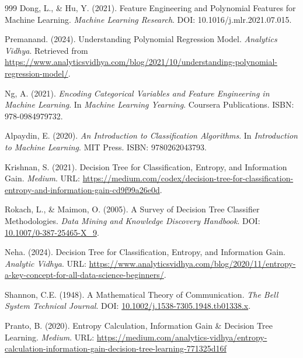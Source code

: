 \documentclass[12pt, a4paper,oneside]{book}
\numberwithin{equation}{section}
\begin{document}
\begin{thebibliography}{999}
Dong, L., \& Hu, Y. (2021). Feature Engineering and Polynomial Features for Machine Learning. \textit{Machine Learning Research}. DOI: 10.1016/j.mlr.2021.07.015.

Premanand. (2024). Understanding Polynomial Regression Model. \textit{Analytics Vidhya}. Retrieved from \url{https://www.analyticsvidhya.com/blog/2021/10/understanding-polynomial-regression-model/}{}.

Ng, A. (2021). \textit{Encoding Categorical Variables and Feature Engineering in Machine Learning}. In \textit{Machine Learning Yearning}. Coursera Publications. ISBN: 978-0984979732.

Alpaydin, E. (2020). \textit{An Introduction to Classification Algorithms}. In \textit{Introduction to Machine Learning}. MIT Press. ISBN: 9780262043793.

Krishnan, S. (2021). Decision Tree for Classification, Entropy, and Information Gain. \textit{Medium}. URL: \href{https://medium.com/codex/decision-tree-for-classification-entropy-and-information-gain-cd9f99a26e0d}{https://medium.com/codex/decision-tree-for-classification-entropy-and-information-gain-cd9f99a26e0d}.

Rokach, L., \& Maimon, O. (2005). A Survey of Decision Tree Classifier Methodologies. \textit{Data Mining and Knowledge Discovery Handbook}. DOI: \href{https://doi.org/10.1007/0-387-25465-X_9}{10.1007/0-387-25465-X\_9}.

Neha. (2024). Decision Tree for Classification, Entropy, and Information Gain. \textit{Analytic Vidhya}. URL: \href{https://www.analyticsvidhya.com/blog/2020/11/entropy-a-key-concept-for-all-data-science-beginners/}{https://www.analyticsvidhya.com/blog/2020/11/entropy-a-key-concept-for-all-data-science-beginners/}.

Shannon, C.E. (1948). A Mathematical Theory of Communication. \textit{The Bell System Technical Journal}. DOI: \href{https://doi.org/10.1002/j.1538-7305.1948.tb01338.x}{10.1002/j.1538-7305.1948.tb01338.x}.

Pranto, B. (2020). Entropy Calculation, Information Gain & Decision Tree Learning. \textit{Medium}. URL: \href{https://medium.com/analytics-vidhya/entropy-calculation-information-gain-decision-tree-learning-771325d16f}{https://medium.com/analytics-vidhya/entropy-calculation-information-gain-decision-tree-learning-771325d16f}


\end{thebibliography}
\end{document}
